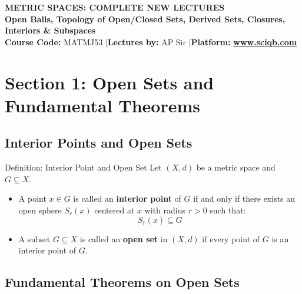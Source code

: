 \documentclass[11pt,a4paper]{article}
\begin{document}
\begin{center}
    \begin{tcolorbox}[sharp corners, boxrule=1.5pt]
        \begin{center}
            {\Large \bfseries \color{primarynavy} METRIC SPACES: COMPLETE NEW LECTURES}\\[4pt]
            {\large \bfseries \color{secondaryteal} Open Balls, Topology of Open/Closed Sets, Derived Sets, Closures, Interiors \& Subspaces}\\[6pt]
            {\small \textbf{Course Code:} MATMJ53 \quad|\quad \textbf{Lectures by:} AP Sir \quad|\quad \textbf{Platform:} \href{https://www.sciqb.com}{\color{accentblue}\textbf{www.sciqb.com}}}
        \end{center}
    \end{tcolorbox}
\end{center}

\vspace{0.2cm}

\tableofcontents
\newpage

\section{Section 1: Open Sets and Fundamental Theorems}

\subsection{Interior Points and Open Sets}

\begin{defbox}{Definition: Interior Point and Open Set}
Let $(X, d)$ be a metric space and $G \subseteq X$.
\begin{itemize}
    \item A point $x \in G$ is called an \textbf{interior point} of $G$ if and only if there exists an open sphere $S_r(x)$ centered at $x$ with radius $r > 0$ such that:
    \begin{equation}
        S_r(x) \subseteq G
    \end{equation}
    \item A subset $G \subseteq X$ is called an \textbf{open set} in $(X, d)$ if every point of $G$ is an interior point of $G$.
\end{itemize}
\end{defbox}

\subsection{Fundamental Theorems on Open Sets}
\end{document}
